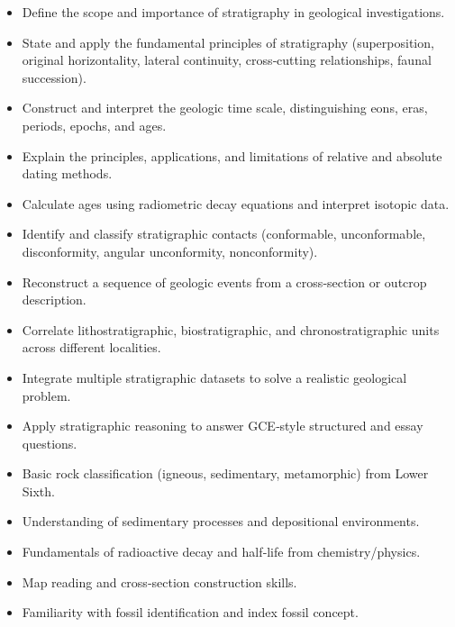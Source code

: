 \documentclass[11pt]{article}
\begin{document}
\begin{objectifs}
\begin{itemize}
\item Define the scope and importance of stratigraphy in geological investigations.
\item State and apply the fundamental principles of stratigraphy (superposition, original horizontality, lateral continuity, cross‑cutting relationships, faunal succession).
\item Construct and interpret the geologic time scale, distinguishing eons, eras, periods, epochs, and ages.
\item Explain the principles, applications, and limitations of relative and absolute dating methods.
\item Calculate ages using radiometric decay equations and interpret isotopic data.
\item Identify and classify stratigraphic contacts (conformable, unconformable, disconformity, angular unconformity, nonconformity).
\item Reconstruct a sequence of geologic events from a cross‑section or outcrop description.
\item Correlate lithostratigraphic, biostratigraphic, and chronostratigraphic units across different localities.
\item Integrate multiple stratigraphic datasets to solve a realistic geological problem.
\item Apply stratigraphic reasoning to answer GCE‑style structured and essay questions.
\end{itemize}
\end{objectifs}

\begin{prerequis}
\begin{itemize}
\item Basic rock classification (igneous, sedimentary, metamorphic) from Lower Sixth.
\item Understanding of sedimentary processes and depositional environments.
\item Fundamentals of radioactive decay and half‑life from chemistry/physics.
\item Map reading and cross‑section construction skills.
\item Familiarity with fossil identification and index fossil concept.
\end{itemize}
\end{prerequis}

\newpage
\end{document}

